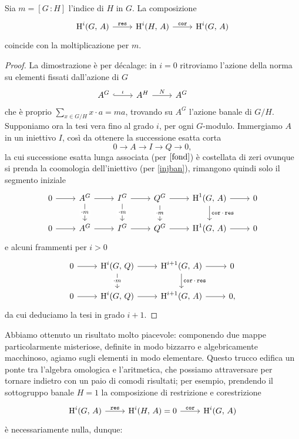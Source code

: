 \begin{theorem}
	Sia $ m = [G \,\colon H] $ l'indice di $ H $ in $ G $. La composizione
	\[\begin{tikzcd}
	\HH^i(G, \, A) \rar["\Res"] & \HH^i(H, \, A) \rar["\Cor"] & \HH^i(G, \, A)
	\end{tikzcd}  \]
	coincide con la moltiplicazione per $ m $.
\end{theorem}
\begin{proof}
	La dimostrazione è per décalage: in $ i = 0 $ ritroviamo l'azione della norma su elementi fissati dall'azione di $ G $
	\[\begin{tikzcd}
	A^G \rar["\iota", hookrightarrow] & A^H \rar["N"] & A^G &
	\end{tikzcd}  \]
	che è proprio $ \sum_{x \in G/H} x \cdot a = ma $, trovando su $ A^G $ l'azione banale di $ G/H $.
	Supponiamo ora la tesi vera fino al grado $ i $, per ogni $ G $-modulo. Immergiamo $ A $ in un iniettivo $ I $, così da ottenere la successione esatta corta
	\[ 0 \to A \to I \to Q \to 0, \]
	la cui successione esatta lunga associata (per $ \ref{fond} $) è costellata di zeri ovunque si prenda la coomologia dell'iniettivo (per \ref{injban}), rimangono quindi solo il segmento iniziale
	\[\begin{tikzcd}
	0 \rar
	& A^G \rar\dar["\cdot m" description]
	& I^G \rar\dar["\cdot m" description] 
	& Q^G \rar\dar["\cdot m" description] 
	& \HH^1(G, \, A) \rar\dar["\Cor \cdot \Res"] 
	& 0 \\
	0 \rar 
	& A^G \rar 
	& I^G \rar 
	& Q^G \rar 
	& \HH^1(G, \, A) \rar 
	& 0
	\end{tikzcd}\]
	e alcuni frammenti per $ i > 0 $
	\[\begin{tikzcd}
	0 \rar & \HH^i(G, \, Q) \rar\dar["\cdot m" description] & \HH^{i+1}(G, \, A) \rar\dar["\Cor \cdot \Res"] & 0 \\
	0 \rar & \HH^i(G, \, Q) \rar & \HH^{i+1}(G, \, A) \rar & 0,
	\end{tikzcd}\]
	da cui deduciamo la tesi in grado $ i+1 $.
\end{proof}

Abbiamo ottenuto un risultato molto piacevole: componendo due mappe particolarmente misteriose, definite in modo bizzarro e algebricamente macchinoso, agiamo sugli elementi in modo elementare. Questo trucco edifica un ponte tra l'algebra omologica e l'aritmetica, che possiamo attraversare per tornare indietro con un paio di comodi risultati; per esempio, prendendo il sottogruppo banale $ H = 1 $ la composizione di restrizione e corestrizione
\[\begin{tikzcd}
\HH^i(G, \, A) \rar["\Res"] & \HH^i(H, \, A) = 0 \rar["\Cor"] & \HH^i(G, \, A)
\end{tikzcd}  \]
è necessariamente nulla, dunque:

